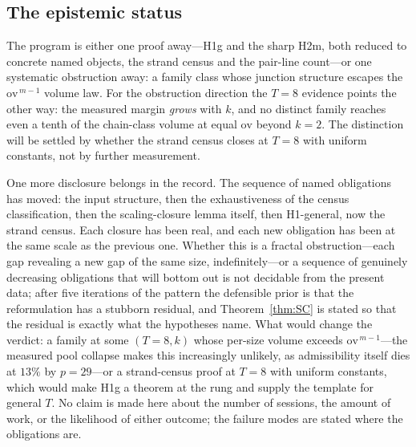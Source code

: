 \subsection{The epistemic status}\label{sec:scale-status}

The program is either one proof away---H1g and the sharp H2m, both
reduced to concrete named objects, the strand census and the pair-line
count---or one systematic obstruction away: a family class whose
junction structure escapes the $\mathrm{ov}^{\,m-1}$ volume law. For
the obstruction direction the $T=8$ evidence points the other way: the
measured margin \emph{grows} with $k$, and no distinct family reaches
even a tenth of the chain-class volume at equal $\mathrm{ov}$ beyond
$k=2$. The distinction will be settled by whether the strand census
closes at $T=8$ with uniform constants, not by further measurement.

One more disclosure belongs in the record. The sequence of named
obligations has moved: the input structure, then the exhaustiveness of
the census classification, then the scaling-closure lemma itself, then
H1-general, now the strand census. Each closure has been real, and
each new obligation has been at the same scale as the previous one.
Whether this is a fractal obstruction---each gap revealing a new gap of
the same size, indefinitely---or a sequence of genuinely decreasing
obligations that will bottom out is not decidable from the present
data; after five iterations of the pattern the defensible prior is that
the reformulation has a stubborn residual, and Theorem~\ref{thm:SC} is
stated so that the residual is exactly what the hypotheses name. What
would change the verdict: a family at some $(T=8,k)$ whose per-size
volume exceeds $\mathrm{ov}^{\,m-1}$---the measured pool collapse
makes this increasingly unlikely, as admissibility itself dies at
$13\%$ by $p=29$---or a strand-census proof at $T=8$ with uniform
constants, which would make H1g a theorem at the rung and supply the
template for general $T$. No claim is made here about the number of
sessions, the amount of work, or the likelihood of either outcome; the
failure modes are stated where the obligations are.


